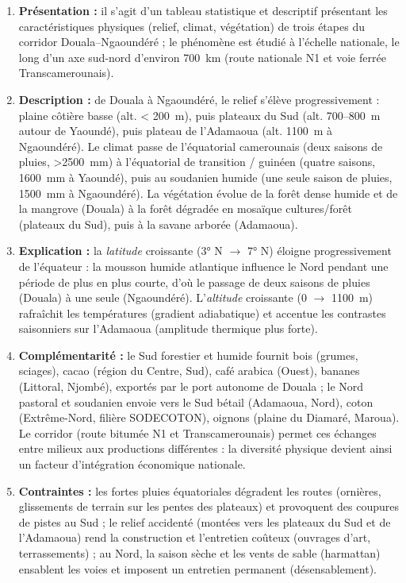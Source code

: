 \documentclass[11pt]{article}
\begin{document}
\begin{corrige}
\begin{enumerate}
\item \textbf{Présentation :} il s'agit d'un tableau statistique et descriptif présentant les caractéristiques physiques (relief, climat, végétation) de trois étapes du corridor Douala--Ngaoundéré ; le phénomène est étudié à l'échelle nationale, le long d'un axe sud-nord d'environ \SI{700}{km} (route nationale N1 et voie ferrée Transcamerounais).
\item \textbf{Description :} de Douala à Ngaoundéré, le relief s'élève progressivement : plaine côtière basse (alt. < \SI{200}{m}), puis plateaux du Sud (alt. 700--\SI{800}{m} autour de Yaoundé), puis plateau de l'Adamaoua (alt. \SI{1100}{m} à Ngaoundéré). Le climat passe de l'équatorial camerounais (deux saisons de pluies, \SI{>2500}{mm}) à l'équatorial de transition / guinéen (quatre saisons, \SI{1600}{mm} à Yaoundé), puis au soudanien humide (une seule saison de pluies, \SI{1500}{mm} à Ngaoundéré). La végétation évolue de la forêt dense humide et de la mangrove (Douala) à la forêt dégradée en mosaïque cultures/forêt (plateaux du Sud), puis à la savane arborée (Adamaoua).
\item \textbf{Explication :} la \emph{latitude} croissante (3° N $\to$ 7° N) éloigne progressivement de l'équateur : la mousson humide atlantique influence le Nord pendant une période de plus en plus courte, d'où le passage de deux saisons de pluies (Douala) à une seule (Ngaoundéré). L'\emph{altitude} croissante (0 $\to$ \SI{1100}{m}) rafraîchit les températures (gradient adiabatique) et accentue les contrastes saisonniers sur l'Adamaoua (amplitude thermique plus forte).
\item \textbf{Complémentarité :} le Sud forestier et humide fournit bois (grumes, sciages), cacao (région du Centre, Sud), café arabica (Ouest), bananes (Littoral, Njombé), exportés par le port autonome de Douala ; le Nord pastoral et soudanien envoie vers le Sud bétail (Adamaoua, Nord), coton (Extrême-Nord, filière SODECOTON), oignons (plaine du Diamaré, Maroua). Le corridor (route bitumée N1 et Transcamerounais) permet ces échanges entre milieux aux productions différentes : la diversité physique devient ainsi un facteur d'intégration économique nationale.
\item \textbf{Contraintes :} les fortes pluies équatoriales dégradent les routes (ornières, glissements de terrain sur les pentes des plateaux) et provoquent des coupures de pistes au Sud ; le relief accidenté (montées vers les plateaux du Sud et de l'Adamaoua) rend la construction et l'entretien coûteux (ouvrages d'art, terrassements) ; au Nord, la saison sèche et les vents de sable (harmattan) ensablent les voies et imposent un entretien permanent (désensablement).

\end{enumerate}
\end{corrige}
\end{document}
